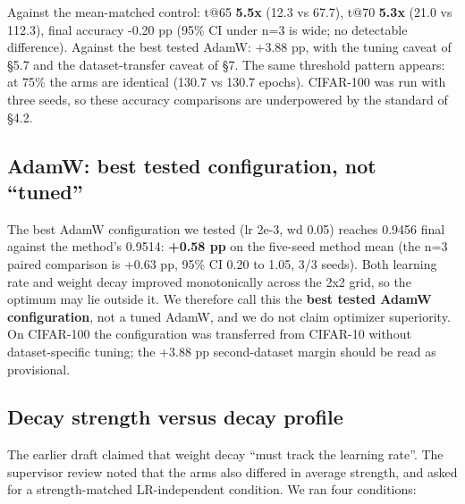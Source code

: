 \documentclass[11pt,a4paper]{article}
\begin{document}
Against the mean-matched control: t@65 \textbf{5.5x} (12.3 vs 67.7), t@70 \textbf{5.3x} (21.0 vs 112.3), final accuracy -0.20 pp (95\% CI under n=3 is wide; no detectable difference). Against the best tested AdamW: +3.88 pp, with the tuning caveat of \S{}5.7 and the dataset-transfer caveat of \S{}7. The same threshold pattern appears: at 75\% the arms are identical (130.7 vs 130.7 epochs). CIFAR-100 was run with three seeds, so these accuracy comparisons are underpowered by the standard of \S{}4.2.

\subsection{AdamW: best tested configuration, not ``tuned''}
The best AdamW configuration we tested (lr 2e-3, wd 0.05) reaches 0.9456 final against the method's 0.9514: \textbf{+0.58 pp} on the five-seed method mean (the n=3 paired comparison is +0.63 pp, 95\% CI 0.20 to 1.05, 3/3 seeds). Both learning rate and weight decay improved monotonically across the 2x2 grid, so the optimum may lie outside it. We therefore call this the \textbf{best tested AdamW configuration}, not a tuned AdamW, and we do not claim optimizer superiority. On CIFAR-100 the configuration was transferred from CIFAR-10 without dataset-specific tuning; the +3.88 pp second-dataset margin should be read as provisional.

\subsection{Decay strength versus decay profile}
The earlier draft claimed that weight decay ``must track the learning rate''. The supervisor review noted that the arms also differed in average strength, and asked for a strength-matched LR-independent condition. We ran four conditions:

\begin{center}
\small
{}
\end{center}
\end{document}

